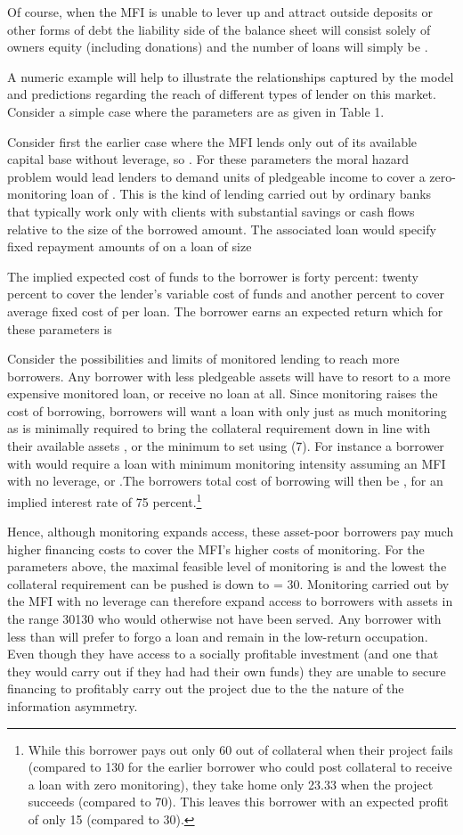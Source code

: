 \documentclass{article}
\begin{document}
Of course, when the MFI is unable to lever up and attract outside
deposits or other forms of debt the liability side of the balance sheet
will consist solely of owners equity (including donations) and the
number of loans will simply be .

A numeric example will help to illustrate the relationships captured by
the model and predictions regarding the reach of different types of
lender on this market. Consider a simple case where the parameters are
as given in Table 1.

Consider first the earlier case where the MFI lends only out of its
available capital base without leverage, so . For these parameters the
moral hazard problem would lead lenders to demand units of pledgeable
income to cover a zero-monitoring loan of . This is the kind of lending
carried out by ordinary banks that typically work only with clients with
substantial savings or cash flows relative to the size of the borrowed
amount. The associated loan would specify fixed repayment amounts of on
a loan of size

The implied expected cost of funds to the borrower is forty percent:
twenty percent to cover the lender's variable cost of funds and another
percent to cover average fixed cost of per loan. The borrower earns an
expected return which for these parameters is

Consider the possibilities and limits of monitored lending to reach more
borrowers. Any borrower with less pledgeable assets will have to resort
to a more expensive monitored loan, or receive no loan at all. Since
monitoring raises the cost of borrowing, borrowers will want a loan with
only just as much monitoring as is minimally required to bring the
collateral requirement down in line with their available assets , or the
minimum to set using (7). For instance a borrower with would require a
loan with minimum monitoring intensity assuming an MFI with no leverage,
or .The borrowers total cost of borrowing will then be , for an implied
interest rate of 75 percent.\footnote{While this borrower pays out only
  60 out of collateral when their project fails (compared to 130 for the
  earlier borrower who could post collateral to receive a loan with zero
  monitoring), they take home only 23.33 when the project succeeds
  (compared to 70). This leaves this borrower with an expected profit of
  only 15 (compared to 30).}

Hence, although monitoring expands access, these asset-poor borrowers
pay much higher financing costs to cover the MFI's higher costs of
monitoring. For the parameters above, the maximal feasible level of
monitoring is and the lowest the collateral requirement can be pushed is
down to = 30. Monitoring carried out by the MFI with no leverage can
therefore expand access to borrowers with assets in the range 30130 who
would otherwise not have been served. Any borrower with less than will
prefer to forgo a loan and remain in the low-return occupation. Even
though they have access to a socially profitable investment (and one
that they would carry out if they had had their own funds) they are
unable to secure financing to profitably carry out the project due to
the the nature of the information asymmetry.
\end{document}
